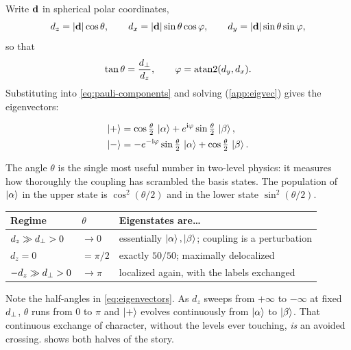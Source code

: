 Write $\mathbf{d}$ in spherical polar coordinates,
%
\begin{equation}
d_z = |\mathbf{d}|\cos\theta,\qquad
d_x = |\mathbf{d}|\sin\theta\cos\varphi,\qquad
d_y = |\mathbf{d}|\sin\theta\sin\varphi,
\end{equation}
%
so that
%
\begin{equation}
\tan\theta = \frac{d_{\perp}}{d_z},
\qquad
\varphi = \operatorname{atan2}(d_y,d_x).
\label{eq:mixing-angle}
\end{equation}
%
Substituting into \cref{eq:pauli-components} and solving (\cref{app:eigvec}) gives the
eigenvectors:

\begin{keyresult}[Eigenvectors]
\vspace{-0.35cm}
\begin{align}
\ket{+} &= \cos\tfrac{\theta}{2}\,\ket{\alpha} + e^{\mathrm{i}\varphi}\sin\tfrac{\theta}{2}\,\ket{\beta},\\
\ket{-} &= -e^{-\mathrm{i}\varphi}\sin\tfrac{\theta}{2}\,\ket{\alpha} + \cos\tfrac{\theta}{2}\,\ket{\beta}.
\label{eq:eigenvectors}
\end{align}
\end{keyresult}

\noindent
The angle $\theta$ is the single most useful number in two-level physics: it measures how
thoroughly the coupling has scrambled the basis states. The population of $\ket{\alpha}$
in the upper state is $\cos^2(\theta/2)$ and in the lower state $\sin^2(\theta/2)$.

\begin{center}
\small
\begin{tabular}{@{}lll@{}}
\toprule
Regime & $\theta$ & Eigenstates are\ldots \\
\midrule
$d_z \gg d_{\perp} > 0$   & $\to 0$     & essentially $\ket{\alpha},\ket{\beta}$; coupling is a perturbation \\
$d_z = 0$              & $=\pi/2$    & exactly $50/50$; maximally delocalized \\
$-d_z \gg d_{\perp} > 0$  & $\to \pi$   & localized again, with the labels exchanged \\
\bottomrule
\end{tabular}
\end{center}

\noindent
Note the half-angles in \cref{eq:eigenvectors}. As $d_z$ sweeps from $+\infty$ to
$-\infty$ at fixed $d_{\perp}$, $\theta$ runs from $0$ to $\pi$ and $\ket{+}$ evolves
continuously from $\ket{\alpha}$ to $\ket{\beta}$. That continuous exchange of character,
without the levels ever touching, \emph{is} an avoided crossing. 
shows both halves of the story.

